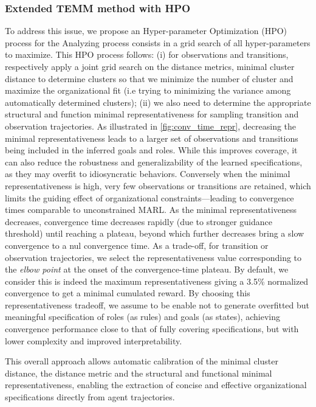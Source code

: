 \subsubsection{Extended TEMM method with HPO}
To address this issue, we propose an Hyper-parameter Optimization (HPO) process for the Analyzing process consists in a grid search of all hyper-parameters to maximize. This HPO process follows:
%
(i) for observations and transitions, respectively apply a joint grid search on the distance metrics, minimal cluster distance to determine clusters so that we minimize the number of cluster and maximize the organizational fit (i.e trying to minimizing the variance among automatically determined clusters);
%
(ii) we also need to determine the appropriate structural and function minimal representativeness for sampling transition and observation trajectories. As illustrated in \autoref{fig:conv_time_repr}, decreasing the minimal representativeness leads to a larger set of observations and transitions being included in the inferred goals and roles. While this improves coverage, it can also reduce the robustness and generalizability of the learned specifications, as they may overfit to idiosyncratic behaviors.
%
Conversely when the minimal representativeness is high, very few observations or transitions are retained, which limits the guiding effect of organizational constraints—leading to convergence times comparable to unconstrained MARL. As the minimal representativeness decreases, convergence time decreases rapidly (due to stronger guidance threshold) until reaching a plateau, beyond which further decreases bring a slow convergence to a nul convergence time.
%
As a trade-off, for transition or observation trajectories, we select the representativeness value corresponding to the \textit{elbow point} at the onset of the convergence-time plateau. By default, we consider this is indeed the maximum representativeness giving a 3.5\% normalized convergence to get a minimal cumulated reward. By choosing this representativeness tradeoff, we assume to be enable not to generate overfitted but meaningful specification of roles (as rules) and goals (as states), achieving convergence performance close to that of fully covering specifications, but with lower complexity and improved interpretability.

This overall approach allows automatic calibration of the minimal cluster distance, the distance metric and the structural and functional minimal representativeness, enabling the extraction of concise and effective organizational specifications directly from agent trajectories.

